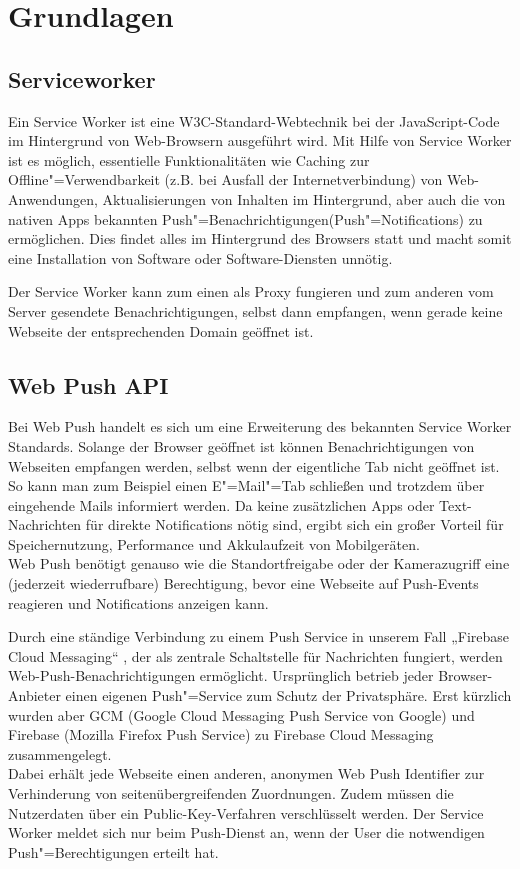 \chapter{Grundlagen}

\section{Serviceworker}
\label{sec_grundladge_serviceworker}

Ein Service Worker ist eine W3C-Standard-Webtechnik bei der JavaScript-Code im Hintergrund von Web-Browsern ausgeführt wird. Mit Hilfe von Service Worker ist es möglich, essentielle Funktionalitäten wie Caching zur Offline"=Verwendbarkeit (z.B. bei Ausfall der Internetverbindung) von Web-Anwendungen, Aktualisierungen von Inhalten im Hintergrund, aber auch die von nativen Apps bekannten Push"=Benachrichtigungen(Push"=Notifications) zu ermöglichen. Dies findet alles im Hintergrund des Browsers statt und macht somit eine Installation von Software oder Software-Diensten unnötig.

Der Service Worker kann zum einen als Proxy fungieren und zum anderen vom Server gesendete Benachrichtigungen, selbst dann empfangen, wenn gerade keine Webseite der entsprechenden Domain geöffnet ist. 

\section{Web Push API}
\label{sec_grundlagen_web-push}
    
Bei Web Push handelt es sich um eine Erweiterung des bekannten Service Worker Standards. Solange der Browser geöffnet ist können Benachrichtigungen von Webseiten empfangen werden, selbst wenn der eigentliche Tab nicht geöffnet ist. So kann man zum Beispiel einen E"=Mail"=Tab schließen und trotzdem über eingehende Mails informiert werden. Da keine zusätzlichen Apps oder Text-Nachrichten für direkte Notifications nötig sind, ergibt sich ein großer Vorteil für Speichernutzung, Performance und Akkulaufzeit von Mobilgeräten. \\
Web Push benötigt genauso wie die Standortfreigabe oder der Kamerazugriff eine (jederzeit wiederrufbare) Berechtigung, bevor eine Webseite auf Push-Events reagieren und Notifications anzeigen kann. 

Durch eine ständige Verbindung zu einem Push Service in unserem Fall „Firebase Cloud Messaging“ , der als zentrale Schaltstelle für Nachrichten fungiert, werden Web-Push-Benachrichtigungen ermöglicht. Ursprünglich betrieb jeder Browser-Anbieter einen eigenen Push"=Service zum Schutz der Privatsphäre. Erst kürzlich wurden aber GCM (Google Cloud Messaging Push Service von Google) und Firebase (Mozilla Firefox Push Service) zu Firebase Cloud Messaging zusammengelegt. \\
Dabei erhält jede Webseite einen anderen, anonymen Web Push Identifier zur Verhinderung von seitenübergreifenden Zuordnungen. Zudem müssen die Nutzerdaten über ein Public-Key-Verfahren verschlüsselt werden. Der Service Worker meldet sich nur beim Push-Dienst an, wenn der User die notwendigen Push"=Berechtigungen erteilt hat. 